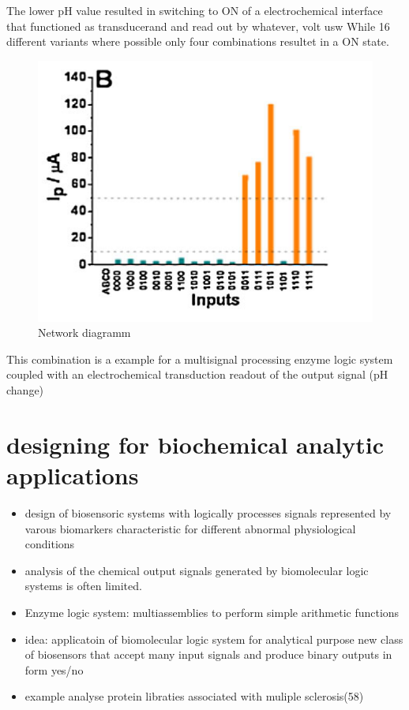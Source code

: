 \documentclass[runningheads]{llncs}
\begin{document}
	
	The lower pH value resulted in switching to ON of a electrochemical interface that functioned as transducerand and  read out by whatever, volt usw
	While 16 different variants where possible only four combinations resultet in a ON state.

	\begin{figure} \centering \includegraphics[scale= 0.2]{ph.png} \caption{Network diagramm} \label{img:ph} \end{figure}
	
	
This combination is a example for a multisignal processing enzyme logic system coupled with an electrochemical transduction readout of the output signal (pH change)
\section{designing for biochemical analytic applications}
	\begin{itemize}
		\item design of biosensoric systems with logically processes signals represented by varous biomarkers characteristic for different abnormal physiological conditions
		\item analysis of the chemical output signals generated by biomolecular logic systems is often limited.
		\item Enzyme logic system: multiassemblies to perform simple arithmetic functions
		\item idea: applicatoin of biomolecular logic system for analytical purpose new class of biosensors that accept many input signals and produce binary outputs in form yes/no 
		\item example analyse protein libraties associated with muliple sclerosis(58)
	\end{itemize}
\end{document}
